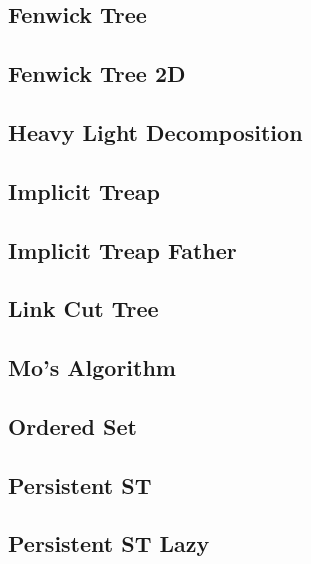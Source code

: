 \subsection{Fenwick Tree}
\raggedbottom
\hrulefill
\subsection{Fenwick Tree 2D}
\raggedbottom
\hrulefill
\subsection{Heavy Light Decomposition}
\raggedbottom
\hrulefill
\subsection{Implicit Treap}
\raggedbottom
\hrulefill
\subsection{Implicit Treap Father}
\raggedbottom
\hrulefill
\subsection{Link Cut Tree}
\raggedbottom
\hrulefill
\subsection{Mo's Algorithm}
\raggedbottom
\hrulefill
\subsection{Ordered Set}
\raggedbottom
\hrulefill
\subsection{Persistent ST}
\raggedbottom
\hrulefill
\subsection{Persistent ST Lazy}
\raggedbottom
\hrulefill

